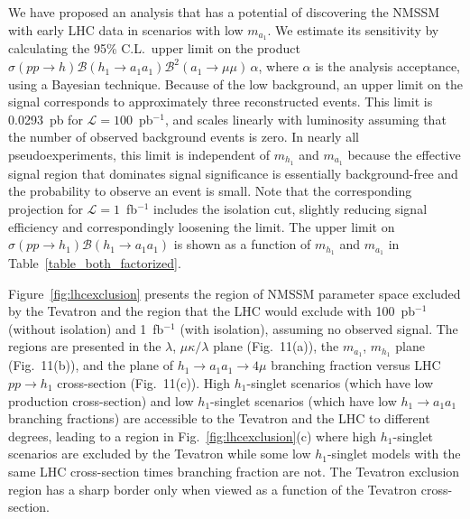 \documentclass[aps,prl,twocolumn,nofootinbib,superscriptaddress]{revtex4}
\begin{document}
We have proposed an analysis that has a potential of discovering the
NMSSM with early LHC data in scenarios with low $m_{a_1}$.  We
estimate its sensitivity by calculating the 95\% C.L.\ upper limit on
the product $\sigma(pp \to h) \mathcal{B}(h_1 \to a_1 a_1)
\mathcal{B}^2(a_1 \to \mu\mu) \, \alpha$, where $\alpha$ is the
analysis acceptance, using a Bayesian technique.  Because of the low
background, an upper limit on the signal corresponds to approximately
three reconstructed events.  This limit is 0.0293~pb for $\mathcal{L}
= 100$~pb$^{-1}$, and scales linearly with luminosity assuming that
the number of observed background events is zero.  In nearly all
pseudoexperiments, this limit is independent of $m_{h_1}$ and
$m_{a_1}$ because the effective signal region that dominates signal
significance is essentially background-free and the probability to
observe an event is small.  Note that the corresponding projection for
$\mathcal{L} = 1$~fb$^{-1}$ includes the isolation cut, slightly
reducing signal efficiency and correspondingly loosening the limit.
The upper limit on $\sigma(pp \to h_1) \mathcal{B}(h_1 \to a_1 a_1)$ is
shown as a function of $m_{h_1}$ and $m_{a_1}$ in
Table~\ref{table_both_factorized}.

Figure~\ref{fig:lhcexclusion} presents the region of NMSSM parameter
space excluded by the Tevatron and the region that the LHC would
exclude with 100~pb$^{-1}$ (without isolation) and 1~fb$^{-1}$ (with
isolation), assuming no observed signal.  The regions are presented in
the $\lambda$, $\mu\kappa/\lambda$ plane (Fig.~11(a)), the $m_{a_1}$,
$m_{h_1}$ plane (Fig.~11(b)), and the plane of $h_1 \to a_1 a_1 \to
4\mu$ branching fraction versus LHC $pp \to h_1$ cross-section
(Fig.~11(c)).  High $h_1$-singlet scenarios (which have low production
cross-section) and low $h_1$-singlet scenarios (which have low $h_1
\to a_1 a_1$ branching fractions) are accessible to the Tevatron and
the LHC to different degrees, leading to a region in
Fig.~\ref{fig:lhcexclusion}(c) where high $h_1$-singlet scenarios are
excluded by the Tevatron while some low $h_1$-singlet models with the
same LHC cross-section times branching fraction are not.  The Tevatron
exclusion region has a sharp border only when viewed as a function of
the Tevatron cross-section.
\end{document}
